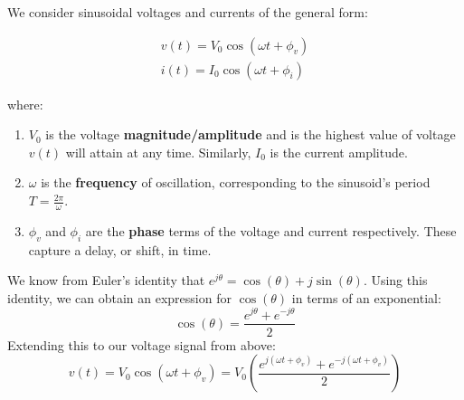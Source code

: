 


We consider sinusoidal voltages and currents of the general form:

\vspace{-15px}
\begin{align*}
v(t) = V_0 \cos(\omega t + \phi_v) \\
i(t) = I_0 \cos(\omega t + \phi_i)
\end{align*}
\vspace{-15px}

\renewcommand{\arraystretch}{1.5}

where:

\begin{enumerate}
\item
    $V_0$ is the voltage \textbf{magnitude/amplitude} and is the highest value of voltage $v(t)$ will attain at any time. Similarly, $I_0$ is the current
    amplitude.
\item
    $\omega$ is the \textbf{frequency} of oscillation, corresponding to the sinusoid's period $T = \frac{2\pi}{\omega}$.
\item
    $\phi_v$ and $\phi_i$ are the \textbf{phase} terms of the voltage and current respectively. These capture a delay, or shift, in time.
\end{enumerate}

We know from Euler's identity that $e^{j\theta}=\cos(\theta)+j\sin(\theta)$. Using this identity, we can obtain an expression for $\cos(\theta)$ in terms of an exponential:
\[\cos(\theta)=\frac{e^{j\theta} + e^{-j\theta}}{2}\]
Extending this to our voltage signal from above:
\[v(t) = V_0 \cos(\omega t + \phi_v)=V_0 \left(\frac{e^{j(\omega t +\phi_v)} + e^{-j(\omega t +\phi_v)}}{2}\right)\]
\vspace{-10px}

